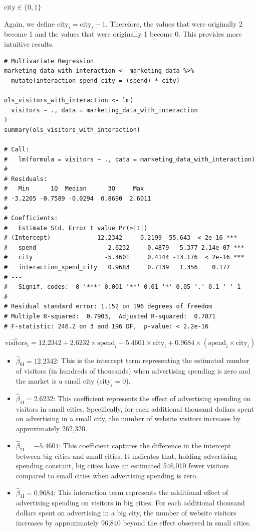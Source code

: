 \documentclass{article}
\begin{document}
\textbf{$\text{city} \in \{0, 1\}$}

Again, we define $\text{city}_i = \text{city}_i - 1$. Therefore, the values that were originally 2 become 1 and the values that were originally 1 become 0. This provides more intuitive results.

\begin{lstlisting}[style=Rstyle, caption=Linear Model for Visitors separeted by City Size]
# Multivariate Regression
marketing_data_with_interaction <- marketing_data %>%
  mutate(interaction_spend_city = (spend) * city)

ols_visitors_with_interaction <- lm(
  visitors ~ ., data = marketing_data_with_interaction
)
summary(ols_visitors_with_interaction)

# Call:
#   lm(formula = visitors ~ ., data = marketing_data_with_interaction)
# 
# Residuals:
#   Min      1Q  Median      3Q     Max 
# -3.2205 -0.7589 -0.0294  0.8690  2.6011 
# 
# Coefficients:
#   Estimate Std. Error t value Pr(>|t|)    
# (Intercept)             12.2342     0.2199  55.643  < 2e-16 ***
#   spend                    2.6232     0.4879   5.377 2.14e-07 ***
#   city                    -5.4601     0.4144 -13.176  < 2e-16 ***
#   interaction_spend_city   0.9683     0.7139   1.356    0.177    
# ---
#   Signif. codes:  0 '***' 0.001 '**' 0.01 '*' 0.05 '.' 0.1 ' ' 1
# 
# Residual standard error: 1.152 on 196 degrees of freedom
# Multiple R-squared:  0.7903,	Adjusted R-squared:  0.7871 
# F-statistic: 246.2 on 3 and 196 DF,  p-value: < 2.2e-16
\end{lstlisting}

\[
\hat{\text{visitors}}_i = 12.2342 + 2.6232 \times \text{spend}_i - 5.4601 \times \text{city}_i + 0.9684 \times (\text{spend}_i \times \text{city}_i)
\]

\begin{itemize}
  \item \(\hat{\beta}_{0 \text{I}} = 12.2342\): This is the intercept term representing the estimated number of visitors (in hundreds of thousands) when advertising spending is zero and the market is a small city (\(\text{city}_i = 0\)).
  \item \(\hat{\beta}_{1 \text{I}} = 2.6232\): This coefficient represents the effect of advertising spending on visitors in small cities. Specifically, for each additional thousand dollars spent on advertising in a small city, the number of website visitors increases by approximately 262,320.
  \item \(\hat{\beta}_{2 \text{I}} = -5.4601\): This coefficient captures the difference in the intercept between big cities and small cities. It indicates that, holding advertising spending constant, big cities have an estimated 546,010 fewer visitors compared to small cities when advertising spending is zero.
  \item \(\hat{\beta}_{3 \text{I}} = 0.9684\): This interaction term represents the additional effect of advertising spending on visitors in big cities. For each additional thousand dollars spent on advertising in a big city, the number of website visitors increases by approximately 96,840 beyond the effect observed in small cities.
\end{itemize}
\end{document}
